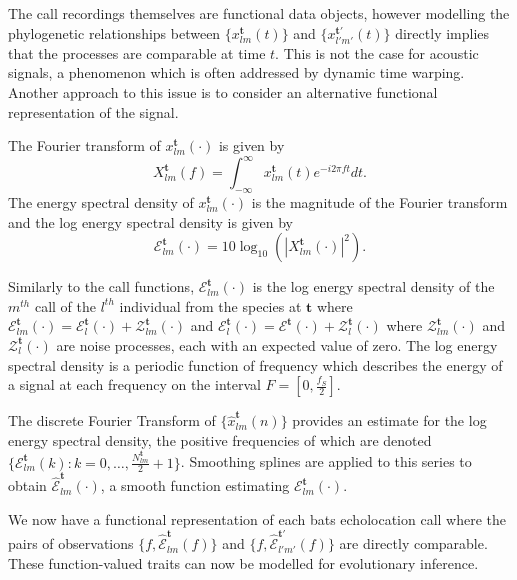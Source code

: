 \documentclass{ws-rv9x6}
\begin{document}
The call recordings themselves are functional data objects, however modelling the phylogenetic relationships between \(\{x_{lm}^{\mathbf{t}}(t)\}\) and \(\{x_{l'm'}^{{\mathbf{t}}'}(t)\}\) directly implies that the processes are comparable at time \(t\). 
This is not the case for acoustic signals, a phenomenon which is often addressed by dynamic time warping.\cite{berndt1994using} Another approach to this issue is to consider an alternative functional representation of the signal. 

The Fourier transform of \(x_{lm}^{\mathbf{t}}(\cdot)\) is given by
\[
X_{lm}^{\mathbf{t}}(f) = \int_{-\infty}^{\infty} x_{lm}^{\mathbf{t}}(t) e^{-i 2\pi f t} dt.
\label{eqn:dft}
\]
The energy spectral density of \(x_{lm}^{\mathbf{t}}(\cdot)\) is the magnitude of the Fourier transform and the log energy spectral density is given by
\[
\mathcal{E}_{lm}^{\mathbf{t}}(\cdot) = 10 \log_{10} \left( |X_{lm}^{\mathbf{t}}(\cdot)|^2 \right).
\]

Similarly to the call functions, \(\mathcal{E}_{lm}^{\mathbf{t}}(\cdot)\) is the log energy spectral density of the \(m^{th}\) call of the \(l^{th}\) individual from the species at \({\mathbf{t}}\) where \(\mathcal{E}_{lm}^{\mathbf{t}}(\cdot) = \mathcal{E}_{l}^{\mathbf{t}}(\cdot) + \mathcal{Z}_{lm}^{\mathbf{t}}(\cdot)\) and \(\mathcal{E}_{l}^{\mathbf{t}}(\cdot) = \mathcal{E}^{\mathbf{t}}(\cdot) + \mathcal{Z}_{l}^{\mathbf{t}}(\cdot)\) where \(\mathcal{Z}_{lm}^{\mathbf{t}}(\cdot)\) and \(\mathcal{Z}_{l}^{\mathbf{t}}(\cdot)\) are noise processes, each with an expected value of zero.  The log energy spectral density is a periodic function of frequency which describes the energy of a signal at each frequency on the interval \(F = [0, \frac{f_S}{2}]\).\cite{antoniou2006digital}

The discrete Fourier Transform\cite{antoniou2006digital}
of \(\{\hat{x}_{lm}^{\mathbf{t}}(n)\}\) provides an estimate for the log energy spectral density, the positive frequencies of which are denoted \(\{\mathcal{E}_{lm}^{\mathbf{t}}(k) : k = 0, \dots, \frac{ N_{lm}^{\mathbf{t}}}{2} + 1\}\). Smoothing splines\cite{friedman2001elements} are applied to this series to obtain \(\hat{\mathcal{E}}_{lm}^{\mathbf{t}}(\cdot)\), a smooth function estimating \(\mathcal{E}_{lm}^{\mathbf{t}}(\cdot)\).

We now have a functional representation of each bats echolocation call where the pairs of observations \(\{f, \hat{\mathcal{E}}_{lm}^{\mathbf{t}}(f)\}\) and \(\{f, \hat{\mathcal{E}}_{l'm'}^{{\mathbf{t}}'}(f)\}\) are directly comparable. These function-valued traits can now be modelled for evolutionary inference.
\end{document}
